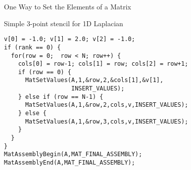 \begin{frame}[fragile]{One Way to Set the Elements of a Matrix}

\begin{block}{Simple 3-point stencil for 1D Laplacian}

\begin{lstlisting}
v[0] = -1.0; v[1] = 2.0; v[2] = -1.0;
if (rank == 0) {
  for(row = 0;  row < N; row++) {
    cols[0] = row-1; cols[1] = row; cols[2] = row+1;
    if (row == 0) {
      MatSetValues(A,1,&row,2,&cols[1],&v[1],
                   INSERT_VALUES);
    } else if (row == N-1) {
      MatSetValues(A,1,&row,2,cols,v,INSERT_VALUES);
    } else {
      MatSetValues(A,1,&row,3,cols,v,INSERT_VALUES);
    }
  }
}
MatAssemblyBegin(A,MAT_FINAL_ASSEMBLY);
MatAssemblyEnd(A,MAT_FINAL_ASSEMBLY);
\end{lstlisting}
\end{block}


\end{frame}
